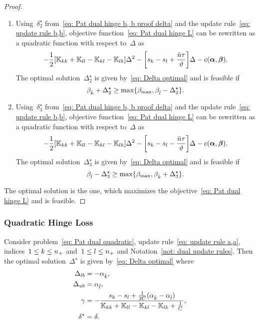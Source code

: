 \begin{proof}
\begin{enumerate}
    \item Using~$\delta^{\star}_2$ from~\eqref{eq: Pat dual hinge b, b proof delta} and the update rule~\eqref{eq: update rule b,b}, objective function~\eqref{eq: Pat dual hinge L} can be rewritten as a quadratic function with respect to~$\Delta$ as
    \begin{equation*}
      - \frac{1}{2} \Brac[s]{\K_{kk} + \K_{ll} - \K_{kl} - \K_{lk}} \Delta^2
      - \Brac[s]{s_k - s_l + \frac{\ntil \tau}{\vartheta}} \Delta
      - c(\bm{\alpha}, \bm{\beta}).
    \end{equation*}
    The optimal solution~$\Delta^{\star}_2$ is given by~\eqref{eq: Delta optimal} and is feasible if
    \begin{equation*}
      \beta_{\hat{k}} + \Delta^{\star}_2 \geq \max\{\beta_{\max} , \beta_{\hat{l}} - \Delta^{\star}_2\}.
    \end{equation*}

    \item Using~$\delta^{\star}_3$ from~\eqref{eq: Pat dual hinge b, b proof delta} and the update rule~\eqref{eq: update rule b,b}, objective function~\eqref{eq: Pat dual hinge L} can be rewritten as a quadratic function with respect to~$\Delta$ as
    \begin{equation*}
      - \frac{1}{2} \Brac[s]{\K_{kk} + \K_{ll} - \K_{kl} - \K_{lk}} \Delta^2
      - \Brac[s]{s_k - s_l - \frac{\ntil \tau}{\vartheta}} \Delta
      - c(\bm{\alpha}, \bm{\beta}).
    \end{equation*}
    The optimal solution~$\Delta^{\star}_3$ is given by~\eqref{eq: Delta optimal} and is feasible if
    \begin{equation*}
      \beta_{\hat{l}} - \Delta^{\star}_3 \geq \max\{\beta_{\max}, \beta_{\hat{k}} + \Delta^{\star}_3\}.
    \end{equation*}
  \end{enumerate}
  The optimal solution is the one, which maximizes the objective~\eqref{eq: Pat dual hinge L} and is feasible.
\end{proof}

\subsubsection{Quadratic Hinge Loss}

\begin{lemma}\label{thm: patmat family quadratic update a,a}
  Consider problem~\eqref{eq: Pat dual quadratic}, update rule~\eqref{eq: update rule a,a}, indices~$1 \leq k \leq n_{+}$ and~$1 \leq l \leq n_{+}$  and Notation~\ref{not: dual update rules}. Then the optimal solution~$\Delta^{\star}$ is given by~\eqref{eq: Delta optimal} where
  \begin{align*}
    \Delta_{lb} & = -\alpha_{\hat{k}}, \\
    \Delta_{ub} & = \alpha_{\hat{l}}, \\
    \gamma & = -\frac{s_k - s_l + \frac{1}{2C}(\alpha_{\hat{k}} - \alpha_{\hat{l}})}{\mathbb{K}_{kk} + \mathbb{K}_{ll} - \mathbb{K}_{kl} - \mathbb{K}_{lk} + \frac{1}{C}}, \\
    \delta^{\star}  & = \delta.
  \end{align*}
\end{lemma}

